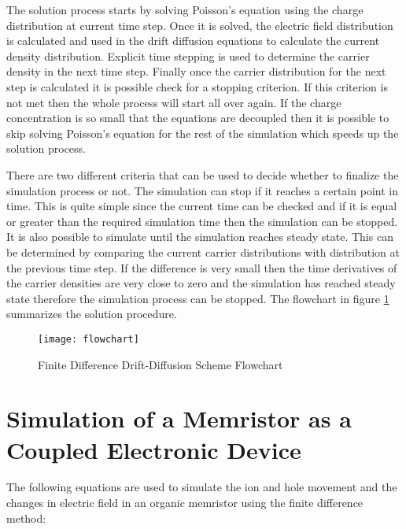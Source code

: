\begin{doublespace}
The solution process starts by solving Poisson's equation using the charge distribution at current time step. Once it is solved, the electric field distribution is calculated and used in the drift diffusion equations to calculate the current density distribution. Explicit time stepping is used to determine the carrier density in the next time step. Finally once the carrier distribution for the next step is calculated it is possible check for a stopping criterion. If this criterion is not met then the whole process will start all over again. If the charge concentration is so small that the equations are decoupled then it is possible to skip solving Poisson's equation for the rest of the simulation which speeds up the solution process.

 There are two different criteria that can be used to decide whether to finalize the simulation process or not. The simulation can stop if it reaches a certain point in time. This is quite simple since the current time can be checked and if it is equal or greater than the required simulation time then the simulation can be stopped. It is also possible to simulate until the simulation reaches steady state. This can be determined by comparing the current carrier distributions with distribution at the previous time step. If the difference is very small then the time derivatives of the carrier densities are very close to zero and the simulation has reached steady state therefore the simulation process can be stopped. The flowchart in figure \ref{flowchart} summarizes the solution procedure.

\clearpage

\begin{figure}
\centering
\texttt{[image: flowchart]}
\caption{Finite Difference Drift-Diffusion Scheme Flowchart} 
\label{flowchart}
\end{figure}
\clearpage
\section{Simulation of a Memristor as a Coupled Electronic Device}

The following equations are used to simulate the ion and hole movement and the changes in electric field in an organic memristor using the finite difference method:


\end{doublespace}
